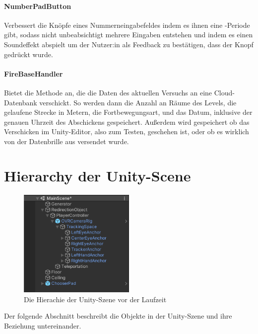 \begin{multicols*}{2}
    \paragraph{NumberPadButton}
    Verbessert die Knöpfe eines Nummerneingabefeldes indem es ihnen eine -Periode gibt,
    sodass nicht unbeabsichtigt mehrere Eingaben entstehen und indem es einen Soundeffekt abspielt um der Nutzer:in als Feedback zu bestätigen, dass der Knopf gedrückt wurde. %

    \paragraph{FireBaseHandler}
    Bietet die Methode  an, die die Daten des aktuellen Versuchs an eine Cloud-Datenbank verschickt. So werden dann die Anzahl an Räume des Levels, die gelaufene Strecke in Metern, die Fortbewegungsart, und das Datum, inklusive der genauen Uhrzeit des Abschickens gespeichert. Außerdem wird gespeichert ob das Verschicken im Unity-Editor, also zum Testen, geschehen ist, oder ob es wirklich von der Datenbrille aus versendet wurde.
\end{multicols*}

\section{Hierarchy der Unity-Scene}\label{sec:hierarchy}

\begin{figure}[!h]
    \centering
    \includegraphics[width=0.5\textwidth]{images/hierarchy.png}
    \caption{Die Hierachie der Unity-Szene vor der Laufzeit}\label{figure:hierarchy}
\end{figure}
Der folgende Abschnitt beschreibt die Objekte in der Unity-Szene und ihre Beziehung untereinander.

